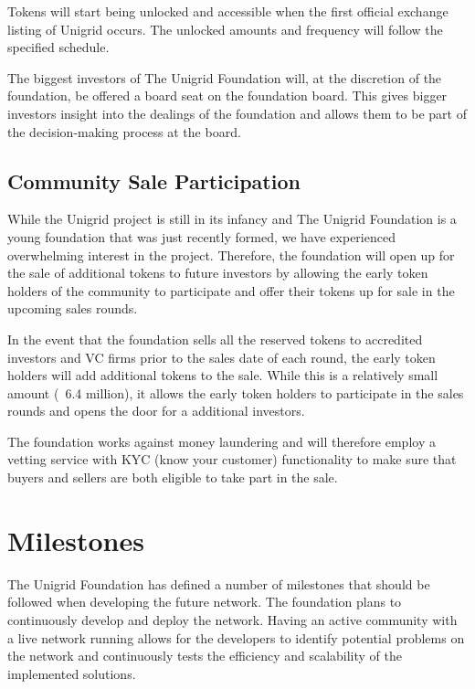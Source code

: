 \documentclass[a4paper,oneside]{article}
\begin{document}
\noindent Tokens will start being unlocked and accessible when the first official exchange listing of Unigrid occurs. The unlocked amounts and frequency will follow the specified schedule.

The biggest investors of The Unigrid Foundation will, at the discretion of the foundation, be offered a board seat on the foundation board. This gives bigger investors insight into the dealings of the foundation and allows them to be part of the decision-making process at the board.

\subsection{Community Sale Participation}
While the Unigrid project is still in its infancy and The Unigrid Foundation is a young foundation that was just recently formed, we have experienced overwhelming interest in the project. Therefore, the foundation will open up for the sale of additional tokens to future investors by allowing the early token holders of the community to participate and offer their tokens up for sale in the upcoming sales rounds.

In the event that the foundation sells all the reserved tokens to accredited investors and VC firms prior to the sales date of each round, the early token holders will add additional tokens to the sale. While this is a relatively small amount (~6.4 million), it allows the early token holders to participate in the sales rounds and opens the door for a additional investors.

The foundation works against money laundering and will therefore employ a vetting service with KYC (know your customer) functionality to make sure that buyers and sellers are both eligible to take part in the sale.

\section{Milestones}
The Unigrid Foundation has defined a number of milestones that should be followed when developing the future network. The foundation plans to continuously develop and deploy the network. Having an active community with a live network running allows for the developers to identify potential problems on the network and continuously tests the efficiency and scalability of the implemented solutions.
\end{document}
